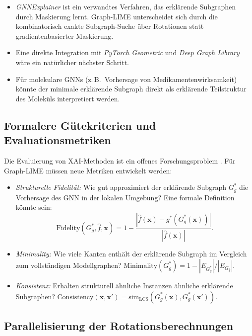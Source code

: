 ﻿\documentclass[a4paper,12pt]{article}
\theoremstyle{definition}
\begin{document}
\begin{itemize}
  \item \emph{GNNExplainer} \citep{Ying2019} ist ein verwandtes Verfahren, das
        erklärende Subgraphen durch Maskierung lernt.
        Graph-LIME unterscheidet sich durch die kombinatorisch exakte
        Subgraph-Suche über Rotationen statt gradientenbasierter Maskierung.
  \item Eine direkte Integration mit \emph{PyTorch Geometric} \citep{Fey2019}
        und \emph{Deep Graph Library} \citep{Wang2019} wäre ein natürlicher
        nächster Schritt.
  \item Für molekulare GNNs (z.\,B.\ Vorhersage von Medikamentenwirksamkeit)
        könnte der minimale erklärende Subgraph direkt als erklärende
        Teilstruktur des Moleküls interpretiert werden.
\end{itemize}

\subsection{Formalere Gütekriterien und Evaluationsmetriken}

Die Evaluierung von XAI-Methoden ist ein offenes Forschungsproblem \citep{Doshi2017}.
Für Graph-LIME müssen neue Metriken entwickelt werden:

\begin{itemize}
  \item \emph{Strukturelle Fidelität:} Wie gut approximiert der erklärende Subgraph
        $G^*_g$ die Vorhersage des GNN in der lokalen Umgebung?
        Eine formale Definition könnte sein:
        \[
          \mathrm{Fidelity}(G^*_g, \hat{f}, \mathbf{x})
          = 1 - \frac{|\hat{f}(\mathbf{x}) - g^*(G^*_g(\mathbf{x}))|}
                     {|\hat{f}(\mathbf{x})|}.
        \]
  \item \emph{Minimality:} Wie viele Kanten enthält der erklärende Subgraph
        im Vergleich zum vollständigen Modellgraphen?
        $\mathrm{Minimality}(G^*_g) = 1 - |E_{G^*_g}| / |E_{G_{\hat{f}}}|$.
  \item \emph{Konsistenz:} Erhalten strukturell ähnliche Instanzen ähnliche
        erklärende Subgraphen?
        $\mathrm{Consistency}(\mathbf{x}, \mathbf{x}')
         = \mathrm{sim}_{\mathrm{LCS}}(G^*_g(\mathbf{x}), G^*_g(\mathbf{x}'))$.
\end{itemize}

\subsection{Parallelisierung der Rotationsberechnungen}
\end{document}
